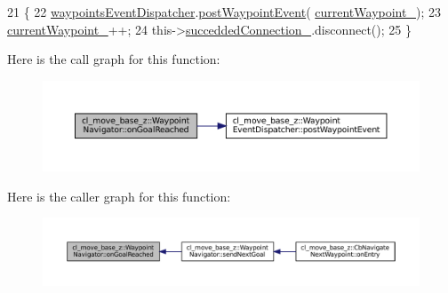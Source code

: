 \begin{DoxyCode}
21 \{
22   \hyperlink{classcl__move__base__z_1_1WaypointNavigator_a4f2be7a9741e8535c414e63335d752a0}{waypointsEventDispatcher}.\hyperlink{classcl__move__base__z_1_1WaypointEventDispatcher_a6462eae610b97df2207ecd93c1544aaf}{postWaypointEvent}(
      \hyperlink{classcl__move__base__z_1_1WaypointNavigator_a82859e418592c2392c20a2d11b9836eb}{currentWaypoint\_});
23   \hyperlink{classcl__move__base__z_1_1WaypointNavigator_a82859e418592c2392c20a2d11b9836eb}{currentWaypoint\_}++;
24   this->\hyperlink{classcl__move__base__z_1_1WaypointNavigator_a6e32b1d6cae56963187d0965de251108}{succeddedConnection\_}.disconnect();
25 \}
\end{DoxyCode}
Here is the call graph for this function\+:
\nopagebreak
\begin{figure}[H]
\begin{center}
\leavevmode
\includegraphics[width=350pt]{classcl__move__base__z_1_1WaypointNavigator_ae10ba80b7e46b62096cac96609f66893_cgraph}
\end{center}
\end{figure}
Here is the caller graph for this function\+:
\nopagebreak
\begin{figure}[H]
\begin{center}
\leavevmode
\includegraphics[width=350pt]{classcl__move__base__z_1_1WaypointNavigator_ae10ba80b7e46b62096cac96609f66893_icgraph}
\end{center}
\end{figure}
\mbox{\label{classcl__move__base__z_1_1WaypointNavigator_a0a7e9e35ed5ba02ff4cfb580ffa25e9a}} 
